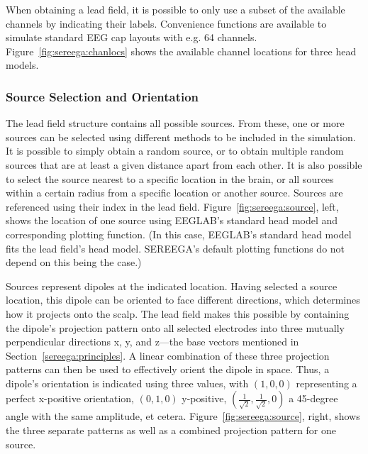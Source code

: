 When obtaining a lead field, it is possible to only use a subset of the available channels by indicating their labels. Convenience functions are available to simulate standard EEG cap layouts with e.g. 64 channels. Figure~\ref{fig:sereega:chanlocs} shows the available channel locations for three head models.


\subsubsection{Source Selection and Orientation}

The lead field structure contains all possible sources. From these, one or more sources can be selected using different methods to be included in the simulation. It is possible to simply obtain a random source, or to obtain multiple random sources that are at least a given distance apart from each other. It is also possible to select the source nearest to a specific location in the brain, or all sources within a certain radius from a specific location or another source. Sources are referenced using their index in the lead field. Figure~\ref{fig:sereega:source}, left, shows the location of one source using EEGLAB's standard head model and corresponding plotting function. (In this case, EEGLAB's standard head model fits the lead field's head model. SEREEGA's default plotting functions do not depend on this being the case.)

Sources represent dipoles at the indicated location. Having selected a source location, this dipole can be oriented to face different directions, which determines how it projects onto the scalp. The lead field makes this possible by containing the dipole's projection pattern onto all selected electrodes into three mutually perpendicular directions x, y, and z---the base vectors mentioned in Section~\ref{sereega:principles}. A linear combination of these three projection patterns can then be used to effectively orient the dipole in space. Thus, a dipole's orientation is indicated using three values, with $(1,0,0)$ representing a perfect x-positive orientation, $(0, 1, 0)$ y-positive, $(\frac{1}{\sqrt{2}},\frac{1}{\sqrt{2}},0)$ a 45-degree angle with the same amplitude, et cetera. Figure~\ref{fig:sereega:source}, right, shows the three separate patterns as well as a combined projection pattern for one source. 

